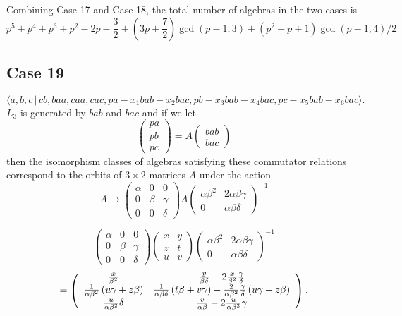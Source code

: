 \documentclass[10pt,thmsa]{article}
\begin{document}
Combining Case 17 and Case 18, the total number of algebras in the two cases
is 
\[
\allowbreak p^5+p^4+p^3+p^2-2p-\frac 32+(3p+\frac 72)\gcd
(p-1,3)+(p^2+p+1)\gcd (p-1,4)/2 
\]

\subsection{Case 19}

\[
\langle
a,b,c\,|%
\,cb,baa,caa,cac,pa-x_{1}bab-x_{2}bac,pb-x_{3}bab-x_{4}bac,pc-x_{5}bab-x_{6}bac\rangle . 
\]%
$L_{3}$ is generated by $bab$ and $bac$ and if we let 
\[
\left( 
\begin{array}{l}
pa \\ 
pb \\ 
pc%
\end{array}%
\right) =A\left( 
\begin{array}{l}
bab \\ 
bac%
\end{array}%
\right) 
\]%
then the isomorphism classes of algebras satisfying these commutator
relations correspond to the orbits of $3\times 2$ matrices $A$ under the
action 
\[
A\rightarrow \left( 
\begin{array}{lll}
\alpha & 0 & 0 \\ 
0 & \beta & \gamma \\ 
0 & 0 & \delta%
\end{array}%
\right) A\left( 
\begin{array}{ll}
\alpha \beta ^{2} & 2\alpha \beta \gamma \\ 
0 & \alpha \beta \delta%
\end{array}%
\right) ^{-1} 
\]

\[
\left( 
\begin{array}{lll}
\alpha & 0 & 0 \\ 
0 & \beta & \gamma \\ 
0 & 0 & \delta%
\end{array}%
\right) \left( 
\begin{array}{ll}
x & y \\ 
z & t \\ 
u & v%
\end{array}%
\right) \left( 
\begin{array}{ll}
\alpha \beta ^{2} & 2\alpha \beta \gamma \\ 
0 & \alpha \beta \delta%
\end{array}%
\right) ^{-1} 
\]
\[
=\left( 
\begin{array}{cc}
\frac{x}{\beta ^{2}} & \frac{y}{\beta \delta }-2\frac{x}{\beta ^{2}}\frac{%
\gamma }{\delta } \\ 
\frac{1}{\alpha \beta ^{2}}\left( u\gamma +z\beta \right) & \frac{1}{\alpha
\beta \delta }\left( t\beta +v\gamma \right) -\frac{2}{\alpha \beta ^{2}}%
\frac{\gamma }{\delta }\left( u\gamma +z\beta \right) \\ 
\frac{u}{\alpha \beta ^{2}}\delta & \frac{v}{\alpha \beta }-2\frac{u}{\alpha
\beta ^{2}}\gamma%
\end{array}%
\right) . 
\]%
$\allowbreak $
\end{document}
